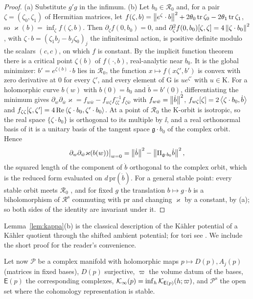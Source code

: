 \begin{proof}
(a) Substitute $g'g$ in the infimum. (b) Let $b_0\in\mathcal R_0$ and, for a
pair $\zeta=(\zeta_0,\zeta_1)$ of Hermitian matrices, let
$f(\zeta,b)=\left\lVert e^\zeta\cdot b\right\rVert^2+2\theta_0\operatorname{tr}\zeta_0-2\theta_1\operatorname{tr}\zeta_1$,
so $\varkappa(b)=\inf_\zeta f(\zeta,b)$. Then $\partial_\zeta f(0,b_0)=0$, and
$\partial_\zeta^2f(0,b_0)[\zeta,\zeta]=4\left\lVert\zeta\cdot b_0\right\rVert^2$, with
$\zeta\cdot b=(\zeta_1b_j-b_j\zeta_0)_j$ the infinitesimal action, is positive
definite modulo the scalars $(c,c)$, on which $f$ is constant. By the
implicit function theorem there is a critical point $\zeta(b)$ of
$f(\cdot,b)$, real-analytic near $b_0$. It is the global minimizer:
$b'=e^{\zeta(b)}\cdot b$ lies in $\mathcal R_0$, the function
$x\mapsto f(x\zeta',b')$ is convex with zero derivative at $0$ for every
$\zeta'$, and every element of $\mathrm G$ is $ue^{\zeta'}$ with
$u\in\mathrm K$. For a holomorphic curve $b(w)$ with $b(0)=b_0$ and
$\dot b=b'(0)$, differentiating the minimum gives
$\partial_w\partial_{\bar w}\varkappa
=f_{w\bar w}-f_{w\zeta}f_{\zeta\zeta}^{-1}f_{\zeta\bar w}$ with
$f_{w\bar w}=\left\lVert\dot b\right\rVert^2$,
$f_{w\zeta}[\zeta]=2\left\langle\zeta\cdot b_0,\dot b\right\rangle$ and
$f_{\zeta\zeta}[\zeta,\zeta']=4\operatorname{Re}\left\langle\zeta\cdot b_0,\zeta'\cdot b_0\right\rangle$. At
a point of $\mathcal R_0$ the $\mathrm K$-orbit is isotropic, so the real
space $\{\zeta\cdot b_0\}$ is orthogonal to its multiple by $\ii$, and a real
orthonormal basis of it is a unitary basis of the tangent space
$\mathfrak g\cdot b_0$ of the complex orbit. Hence
\[
 \partial_w\partial_{\bar w}\varkappa(b(w))\big|_{w=0}
 =\left\lVert\dot b\right\rVert^2-\left\lVert\Pi_{\mathfrak g\cdot b_0}\dot b\right\rVert^2,
\]
the squared length of the component of $\dot b$ orthogonal to the complex
orbit, which is the reduced form evaluated on $d\,\mathrm{pr}(\dot b)$. For a
general stable point: every stable orbit meets $\mathcal R_0$
\cite{kn79,kin94}, and for fixed $g$ the translation $b\mapsto g\cdot b$ is a
biholomorphism of $\mathcal R^{\mathrm s}$ commuting with $\mathrm{pr}$ and
changing $\varkappa$ by a constant, by (a); so both sides of the identity are
invariant under it.
\end{proof}

Lemma~\ref{lem:kappa}(b) is the classical description of the K\"ahler
potential of a K\"ahler quotient through the shifted ambient potential; for
tori see \cite{bg04}. We include the short proof for the reader's
convenience.

Let now $\mathcal P$ be a complex manifold with holomorphic maps
$p\mapsto D(p),A_j(p)$ (matrices in fixed bases), $D(p)$ surjective, $\varpi$
the volume datum of the bases, $\mathsf E(p)$ the corresponding complexes,
$\mathcal K_\infty(p)=\inf_h\mathcal K_{\mathsf E(p)}(h;\varpi)$, and $\mathcal P^{\mathrm s}$
the open set where the cohomology representation is stable.

